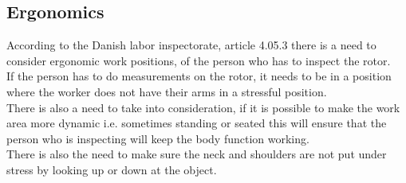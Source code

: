 \subsection{Ergonomics}
According to the Danish labor inspectorate, article 4.05.3 there is a need to consider ergonomic work positions, of the person who has to inspect the rotor.\\
If the person has to do measurements on the rotor, it needs to be in a position where the worker does not have their arms in a stressful position.\\
There is also a need to take into consideration, if it is possible to make the work area more dynamic i.e. sometimes standing or seated this will ensure that the person who is inspecting will keep the body function working.\\
There is also the need to make sure the neck and shoulders are not put under stress by looking up or down at the object\cite{ATpostions}.

